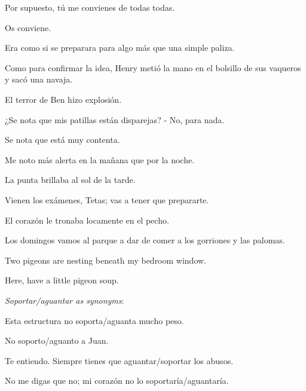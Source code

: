 \sk
Por supuesto, tú me convienes de todas todas.

\sk
Os conviene. 

\sk
Era como si se
preparara para algo más que una simple paliza.

\sk
Como para confirmar la idea, Henry metió la
mano en el bolsillo de sus vaqueros y sacó una
navaja.

\sk
El terror de Ben hizo explosión.

\sk
¿Se nota que mis patillas están disparejas? - No, para nada.

\sk
Se nota que está muy contenta.

\sk
Me noto más alerta en la mañana que por la noche.

\sk
La punta brillaba al sol
de la tarde.

\sk
Vienen los
exámenes, Tetas; vas a tener que prepararte.

\sk
El corazón le tronaba locamente
en el pecho.

\sk
Los domingos vamos al parque a dar de comer a los gorriones y las palomas.

\sk
Two pigeons are nesting beneath my bedroom window.

\sk
Here, have a little pigeon soup.

\bsk
\textit{Soportar/aguantar as synonyms}:

\bsk
Esta estructura no soporta/aguanta mucho peso.

\sk
No soporto/aguanto a Juan.

\sk
Te entiendo. Siempre tienes que aguantar/soportar los abusos.

\sk
No me digas que no; mi corazón no lo soportaría/aguantaría.



